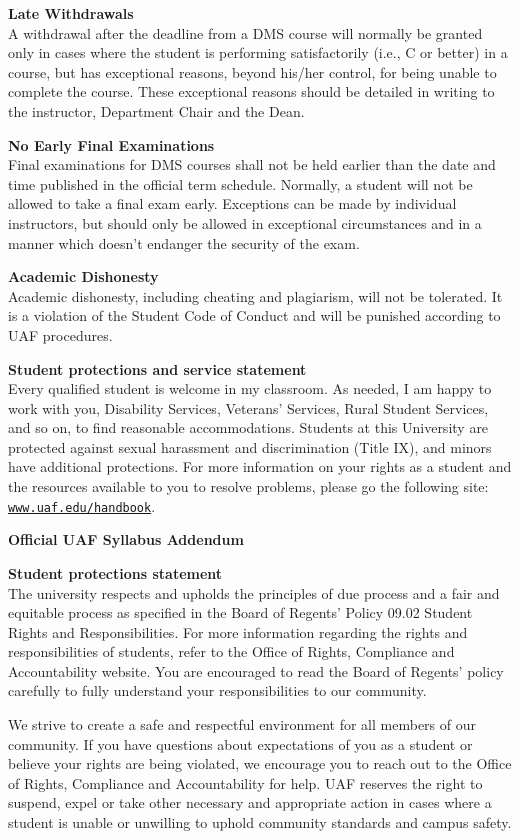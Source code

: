 \documentclass[12pt]{article}
\renewcommand{\emph}[1]{\textsf{\textbf{#1}}}
\newcommand{\localhead}[1]{\par\smallskip\textbf{#1} \smallskip\nobreak\\}%
\def\heading#1{\localhead{\large\emph{#1}}}
\def\subheading#1{\localhead{\emph{#1}}}
\begin{document}
\subheading{Late Withdrawals} 
A withdrawal after the deadline from a DMS course will
  normally be granted only in cases where the student is performing
  satisfactorily (i.e., C or better) in a course, but has exceptional
  reasons, beyond his/her control, for being unable to complete the
  course.  These exceptional reasons should be detailed in writing to
  the instructor, Department Chair and the Dean.

\subheading{No Early Final Examinations}
Final examinations for DMS courses shall not be held earlier than the date and time published in the official term schedule.  Normally, a student will not be allowed to take a final exam early.  Exceptions can be made by individual instructors, but should only be allowed in exceptional circumstances and in a manner which doesn't endanger the security of the exam.

\subheading{Academic Dishonesty}
Academic dishonesty, including cheating and plagiarism, will not be tolerated.  It is a violation of the Student Code of Conduct and will be punished according to UAF procedures.

\subheading{Student protections and service statement}
Every qualified student is welcome in my classroom.  As needed, I am happy to work with you, Disability Services, Veterans' Services, Rural Student Services, and so on, to find reasonable accommodations.  Students at this University are protected against sexual harassment and discrimination (Title IX), and minors have additional protections.  For more information on your rights as a student and the resources available to you to resolve problems, please go the following site: \href{https://www.uaf.edu/handbook/}{\texttt{www.uaf.edu/handbook}}.


\phantom{foo}
\heading{Official UAF Syllabus Addendum}

\subheading{Student protections statement} The university respects and upholds the principles of due process and a fair and equitable process as specified in the Board of Regents' Policy 09.02 Student Rights and Responsibilities. For more information regarding the rights and responsibilities of students, refer to the Office of Rights, Compliance and Accountability website. You are encouraged to read the Board of Regents' policy carefully to fully understand your responsibilities to our community.

We strive to create a safe and respectful environment for all members of our community. If you have questions about expectations of you as a student or believe your rights are being violated, we encourage you to reach out to the  Office of Rights, Compliance and Accountability for help. UAF reserves the right to suspend, expel or take other necessary and appropriate action in cases where a student is unable or unwilling to uphold community standards and campus safety.
\end{document}
